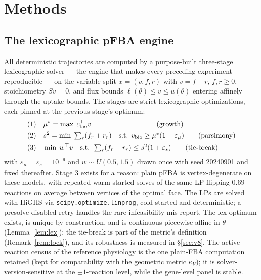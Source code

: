 \documentclass[11pt,a4paper]{article}
\theoremstyle{plain}
\theoremstyle{definition}
\theoremstyle{remark}
\newcommand{\kk}{\kappa_{\!V}}
\begin{document}
\section{Methods}\label{sec:methods}


\subsection{The lexicographic pFBA engine}\label{sec:engine}

All deterministic trajectories are computed by a purpose-built
three-stage lexicographic solver --- the engine that makes every
preceding experiment reproducible --- on the variable split $x = (v, f,
r)$ with $v = f - r$, $f, r \ge 0$, stoichiometry $Sv = 0$, and
flux bounds $\ell(\theta) \le v \le u(\theta)$ entering affinely
through the uptake bounds. The stages are strict lexicographic
optimizations, each pinned at the previous stage's optimum:
\begin{align}
\text{(1)}\quad & \mu^* = \max\; c_{\mathrm{bio}}^\top v
  \qquad\qquad\qquad\qquad\quad\; \text{(growth)} \notag\\
\text{(2)}\quad & s^2 = \min\; \textstyle\sum_r (f_r + r_r)
  \quad\text{s.t. } v_{\mathrm{bio}} \ge \mu^*(1 - \varepsilon_\mu)
  \qquad \text{(parsimony)} \notag\\
\text{(3)}\quad & \min\; w^\top v
  \quad\text{s.t. } \textstyle\sum_r (f_r + r_r) \le s^2(1 +
  \varepsilon_s) \qquad \text{(tie-break)} \notag
\end{align}
with $\varepsilon_\mu = \varepsilon_s = 10^{-9}$ and $w \sim U(0.5, 1.5)$ drawn once with seed 20240901 and fixed thereafter.
Stage 3 exists for a reason: plain pFBA is vertex-degenerate on these
models, with repeated warm-started solves of the same LP flipping
$0.69$ reactions on average between vertices of the optimal face. The
LPs are solved with HiGHS
\citep{huangfu2018} via \texttt{scipy.optimize.linprog}, cold-started
and deterministic; a presolve-disabled retry handles the rare
infeasibility mis-report. The lex optimum exists, is unique by
construction, and is continuous piecewise affine in $\theta$
(Lemma~\ref{lem:lex}); the tie-break is part of the metric's
definition (Remark~\ref{rem:lock}), and its robustness is measured in \S\ref{sec:v8}. The active-reaction census of the reference physiology is the one plain-FBA computation retained (kept for comparability with the geometric metric $\kk$); it is solver-version-sensitive at the $\pm 1$-reaction
level, while the gene-level panel is stable.
\end{document}
